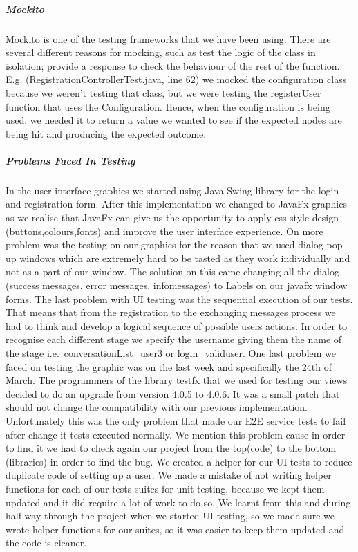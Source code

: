 \documentclass[11pt,a4paper]{report}
\begin{document}
\subparagraph{Mockito}
Mockito is one of the testing frameworks that we have been using. There are several different reasons for mocking, such as test the logic of the class in isolation; provide a response to check the behaviour of the rest of the function. E.g. (RegistrationControllerTest.java, line 62) we mocked the configuration class because we weren’t testing that class, but we were testing the registerUser function that uses the Configuration. Hence, when the configuration is being used, we needed it to return a value we wanted to see if the expected nodes are being hit and producing the expected outcome.

\subparagraph{Problems Faced In Testing}
 In the user interface graphics we started using Java Swing library for the login and registration form. After this implementation we changed to JavaFx graphics as we realise that JavaFx can give us the opportunity to apply css style design (buttons,colours,fonts) and improve the user interface experience. On more problem was the testing on our graphics for the reason that we used dialog pop up windows which are extremely hard to be tasted as they work individually and not as a part of our window. The solution on this came changing all the dialog (success messages, error messages, infomessages) to Labels on our javafx window forms. The last problem with UI testing was the sequential execution of our tests. That means that from the registration to the exchanging messages process we had to think and develop a logical sequence of possible users actions. In order to recognise each different stage we specify the username giving them the name of the stage i.e.\ conversationList\_user3 or login\_validuser. One last problem we faced on testing the graphic was on the last week and specifically the 24th of March. The programmers of the library testfx that we used for testing our views decided to do an upgrade from version 4.0.5 to 4.0.6. It was a small patch that should not change the compatibility with our previous implementation. Unfortunately this was the only problem that made our E2E service tests to fail after change it tests executed normally. We mention this problem cause in order to find it we had to check again our project from the top(code) to the bottom (libraries) in order to find the bug. We created a helper for our UI tests to reduce duplicate code of setting up a user. We made a mistake of not writing helper functions for each of our tests suites for unit testing, because we kept them updated and it did require a lot of work to do so. We learnt from this and during half way through the project when we started UI testing, so we made sure we wrote helper functions for our suites, so it was easier to keep them updated and the code is cleaner.
\end{document}
